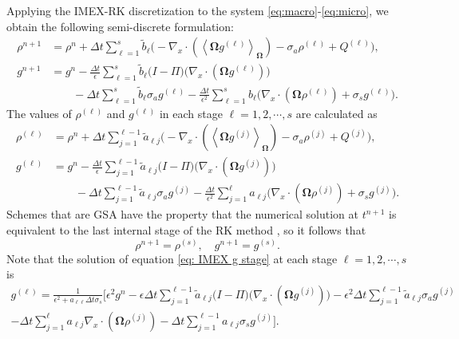 \documentclass[onefignum,onetabnum]{siamart220329}
\begin{document}
Applying the IMEX-RK discretization to the system \eqref{eq:macro}-\eqref{eq:micro}, we obtain the following semi-discrete formulation:
\begin{align}
    \rho^{n+1} &= \rho^{n}  + \Delta t \sum_{\ell=1}^{s} \widetilde{b}_{\ell} \Bigg( -\nabla_{x} \cdot \left( \left\langle \mathbf{\Omega} g^{(\ell)} \right\rangle_{\mathbf{\Omega}} \right) - \sigma_{a} \rho^{(\ell)} + Q^{(\ell)} \Bigg), \label{eq:IMEX rho final} \\
    g^{n+1} &= g^{n} - \frac{\Delta t}{\epsilon} \sum_{\ell=1}^{s} \widetilde{b}_{\ell} \Big( I - \Pi \Big) \Big( \nabla_{x} \cdot \left(  \mathbf{\Omega} g^{(\ell)} \right) \Big) \label{eq:IMEX g final} \\ 
    &\qquad - \Delta t \sum_{\ell=1}^{s} \widetilde{b}_{\ell} \sigma_{a} g^{(\ell)} - \frac{\Delta t}{\epsilon^{2}} \sum_{\ell=1}^{s} b_{\ell} \Big( \nabla_{x} \cdot \left( \mathbf{\Omega} \rho^{(\ell)} \right) + \sigma_{s} g^{(\ell)} \Big). \nonumber
\end{align}
The values of $\rho^{(\ell)}$ and $g^{(\ell)}$ in each stage $\ell = 1, 2, \cdots, s$ are calculated as
\begin{align}
    \rho^{(\ell)} &= \rho^{n}  + \Delta t \sum_{j=1}^{\ell-1} \widetilde{a}_{\ell j} \Big( -\nabla_{x} \cdot \left( \left\langle \mathbf{\Omega} g^{(j)} \right\rangle_{\mathbf{\Omega}} \right) - \sigma_{a} \rho^{(j)} + Q^{(j)} \Big), \label{eq: IMEX rho stage} \\
    g^{(\ell)} &= g^{n} - \frac{\Delta t}{\epsilon} \sum_{j=1}^{\ell-1} \widetilde{a}_{\ell j} \Big( I - \Pi \Big) \Big( \nabla_{x} \cdot \left(  \mathbf{\Omega} g^{(j)} \right) \Big) \label{eq: IMEX g stage} \\ 
    &\qquad - \Delta t \sum_{j=1}^{\ell-1} \widetilde{a}_{\ell j} \sigma_{a} g^{(j)} - \frac{\Delta t}{\epsilon^2} \sum_{j=1}^{\ell} a_{\ell j} \Bigg( \nabla_{x} \cdot \left( \mathbf{\Omega} \rho^{(j)} \right) + \sigma_{s} g^{(j)} \Bigg). \nonumber
\end{align}
Schemes that are GSA have the property that the numerical solution at $t^{n+1}$ is equivalent to the last internal stage of the RK method \cite{dimarco2013asymptotic}, so it follows that $$\rho^{n+1} = \rho^{(s)}, \quad g^{n+1} = g^{(s)}.$$ Note that the solution of equation \eqref{eq: IMEX g stage} at each stage $\ell = 1, 2, \cdots, s$ is
\begin{multline}
    \label{eq:IMEX g stage explicit}
    g^{(\ell)} = \frac{1}{\epsilon^{2} + a_{\ell \ell} \Delta t \sigma_{s}} \Bigg[ \epsilon^{2} g^{n} - \epsilon \Delta t \sum_{j=1}^{\ell-1} \widetilde{a}_{\ell j} \Big( I - \Pi \Big) \Big( \nabla_{x} \cdot \left(  \mathbf{\Omega} g^{(j)} \right) \Big) - \epsilon^{2} \Delta t \sum_{j=1}^{\ell-1} \widetilde{a}_{\ell j} \sigma_{a} g^{(j)} \\  - \Delta t \sum_{j=1}^{\ell} a_{\ell j} \nabla_{x} \cdot \left( \mathbf{\Omega} \rho^{(j)} \right) -  \Delta t \sum_{j=1}^{\ell-1} a_{\ell j} \sigma_{s} g^{(j)} \Bigg].
\end{multline}
\end{document}
